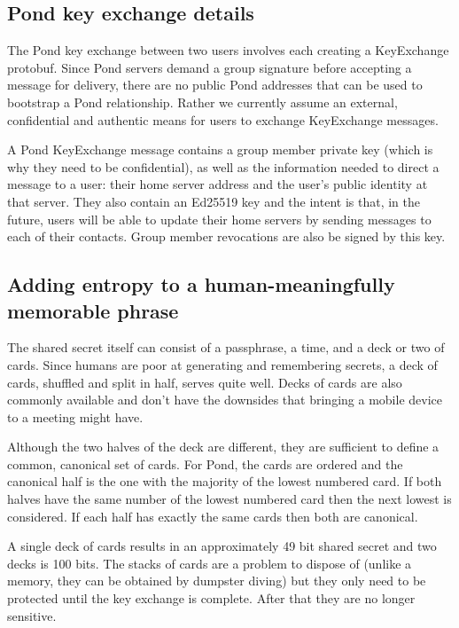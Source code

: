 \documentclass[letterpaper,twocolumn,10pt]{article}
\begin{document}
\subsection{Pond key exchange details}

The Pond key exchange between two users involves each creating a KeyExchange
protobuf\cite{pondprotobufs}. Since Pond servers demand a group signature
before accepting a message for delivery, there are no public Pond addresses
that can be used to bootstrap a Pond relationship.  Rather we currently assume
an external, confidential and authentic means for users to exchange KeyExchange
messages.

A Pond KeyExchange message contains a group member private key (which is why
they need to be confidential), as well as the information needed to direct a
message to a user: their home server address and the user's public identity at
that server.  They also contain an Ed25519 key and the intent is that, in the
future, users will be able to update their home servers by sending messages to
each of their contacts. Group member revocations are also be signed by this
key.

\subsection{Adding entropy to a human-meaningfully memorable phrase}

The shared secret itself can consist of a passphrase, a time, and a deck or two
of cards. Since humans are poor at generating and remembering secrets, a deck
of cards, shuffled and split in half, serves quite well. Decks of cards are also
commonly available and don't have the downsides that bringing a mobile device
to a meeting might have.

Although the two halves of the deck are different, they are sufficient to
define a common, canonical set of cards. For Pond, the cards are ordered and
the canonical half is the one with the majority of the lowest numbered card. If
both halves have the same number of the lowest numbered card then the next
lowest is considered. If each half has exactly the same cards then both are
canonical.

A single deck of cards results in an approximately 49 bit shared secret and two
decks is 100 bits. The stacks of cards are a problem to dispose of (unlike a
memory, they can be obtained by dumpster diving) but they only need to be
protected until the key exchange is complete. After that they are no longer
sensitive.
\end{document}
